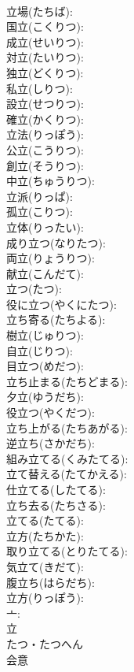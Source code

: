 \documentclass[8pt]{extreport}
\begin{document}
\begin{CJK}{UTF8}{min}
\\	立場(たちば): 
\\	国立(こくりつ): 
\\	成立(せいりつ): 
\\	対立(たいりつ): 
\\	独立(どくりつ): 
\\	私立(しりつ): 
\\	設立(せつりつ): 
\\	確立(かくりつ): 
\\	立法(りっぽう): 
\\	公立(こうりつ): 
\\	創立(そうりつ): 
\\	中立(ちゅうりつ): 
\\	立派(りっぱ): 
\\	孤立(こりつ): 
\\	立体(りったい): 
\\	成り立つ(なりたつ): 
\\	両立(りょうりつ): 
\\	献立(こんだて): 
\\	立つ(たつ): 
\\	役に立つ(やくにたつ): 
\\	立ち寄る(たちよる): 
\\	樹立(じゅりつ): 
\\	自立(じりつ): 
\\	目立つ(めだつ): 
\\	立ち止まる(たちどまる): 
\\	夕立(ゆうだち): 
\\	役立つ(やくだつ): 
\\	立ち上がる(たちあがる): 
\\	逆立ち(さかだち): 
\\	組み立てる(くみたてる): 
\\	立て替える(たてかえる): 
\\	仕立てる(したてる): 
\\	立ち去る(たちさる): 
\\	立てる(たてる): 
\\	立方(たちかた): 
\\	取り立てる(とりたてる): 
\\	気立て(きだて): 
\\	腹立ち(はらだち): 
\\	立方(りっぽう): 
\\	亠: 
\\	立	
\\	たつ・たつへん	
\\	会意 

\end{CJK}
\end{document}
